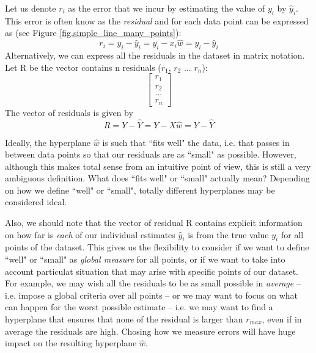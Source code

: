 Let us denote $r_i$ as the error that we incur by estimating the value of $y_i$ by $\hat{y}_i$. This error is often know as the \emph{residual} and for each data point can be expressed as (see Figure \ref{fig.simple_line_many_points}):
\begin{equation}
r_i = y_i - \hat{y}_i = y_i - x_i \hat{w} =  y_i - \hat{y}_i 
\end{equation}
Alternatively, we can express all the residuals in the dataset in matrix notation. Let R be the vector contains n residuals ($r_1$, $r_2$ ... $r_n$):
\begin{equation}
\begin{bmatrix}
r_1 \\
r_2 \\
... \\
r_n
\end{bmatrix}
\end{equation}
The vector of residuals is given by 
\begin{equation}
R = Y - \hat{Y} = Y - X \hat{w} = Y - \hat{Y}
\end{equation}

Ideally, the hyperplane $\hat{w}$ is such that ``fits well" the data, i.e. that passes in between data points so that our residuals are as ``small" as possible. However, although this makes total sense from an intuitive point of view, this is still a very ambiguous definition. What does ``fits well" or ``small" actually mean? Depending on how we define ``well" or ``small", totally different hyperplanes may be considered ideal.

Also, we should note that the vector of residual R contains explicit information on how far is \emph{each} of our individual estimates $\hat{y}_i$ is from the true value $y_i$ for all points of the dataset. This gives us the flexibility to consider if we want to define ``well" or ``small" as \emph{global measure} for all points, or if we want to take into account particulat situation that may arise with specific points of our dataset. For example, we may wish all the residuals to be as small possible in \emph{average} -- i.e. impose a global criteria over all points -- or we may want to focus on what can happen for the worst possible estimate -- i.e. we may want to find a hyperplane that ensures that none of the residual is larger than $r_{max}$, even if in average the residuals are high. Chosing how we measure errors will have huge impact on the resulting hyperplane $\hat{w}$. 

